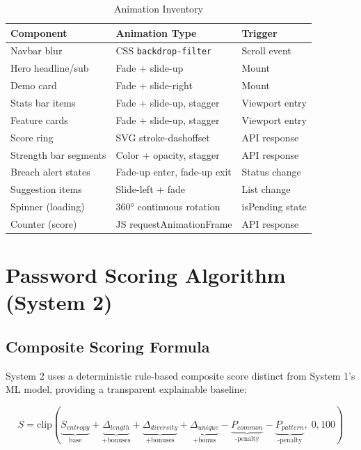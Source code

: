 \documentclass[12pt,a4paper]{article}
\begin{document}
\begin{table}[H]
\centering
\begin{tabular}{llp{4cm}}
\toprule
\textbf{Component} & \textbf{Animation Type} & \textbf{Trigger} \\
\midrule
Navbar blur          & CSS \texttt{backdrop-filter} & Scroll event \\
Hero headline/sub    & Fade + slide-up             & Mount \\
Demo card            & Fade + slide-right          & Mount \\
Stats bar items      & Fade + slide-up, stagger    & Viewport entry \\
Feature cards        & Fade + slide-up, stagger    & Viewport entry \\
Score ring           & SVG stroke-dashoffset       & API response \\
Strength bar segments & Color + opacity, stagger   & API response \\
Breach alert states  & Fade-up enter, fade-up exit & Status change \\
Suggestion items     & Slide-left + fade           & List change \\
Spinner (loading)    & 360° continuous rotation    & isPending state \\
Counter (score)      & JS requestAnimationFrame    & API response \\

\bottomrule
\end{tabular}
\caption{Animation Inventory}
\end{table}

\section{Password Scoring Algorithm (System 2)}

\subsection{Composite Scoring Formula}

System 2 uses a deterministic rule-based composite score distinct from
System 1's ML model, providing a transparent explainable baseline:

\begin{equation}
S = \text{clip}\!\left(
    \underbrace{S_{entropy}}_{\text{base}} +
    \underbrace{\Delta_{length}}_{\text{+bonuses}} +
    \underbrace{\Delta_{diversity}}_{\text{+bonuses}} +
    \underbrace{\Delta_{unique}}_{\text{+bonus}} -
    \underbrace{P_{common}}_{\text{-penalty}} -
    \underbrace{P_{pattern}}_{\text{-penalty}},
    \; 0, 100
\right)
\label{eq:score}
\end{equation}
\end{document}
